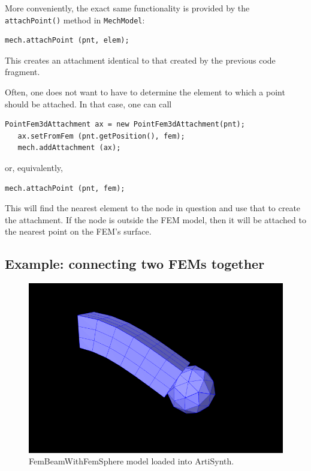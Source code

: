 More conveniently, the exact same functionality is provided
by the {\tt attachPoint()} method in {\tt MechModel}:
%
\begin{lstlisting}[]
   mech.attachPoint (pnt, elem);
\end{lstlisting}
%
This creates an attachment identical to that created by the previous
code fragment.

Often, one does not want to have to determine the element 
to which a point should be attached. In that case, one can call
%
\begin{lstlisting}[]
   PointFem3dAttachment ax = new PointFem3dAttachment(pnt);
   ax.setFromFem (pnt.getPosition(), fem);
   mech.addAttachment (ax);
\end{lstlisting}
%
or, equivalently, 
%
\begin{lstlisting}[]
   mech.attachPoint (pnt, fem);
\end{lstlisting}
%
This will find the nearest element to the node in question and use
that to create the attachment. If the node is outside the FEM model,
then it will be attached to the nearest point on the FEM's surface.

\subsection{Example: connecting two FEMs together}
\label{connectingTwoFems:sec}

\begin{figure}[ht]
	\centering
	\includegraphics[width=\imglength]{images/FemBeamWithFemSphere}
	\caption{FemBeamWithFemSphere model loaded into ArtiSynth.}
	\label{fig:fem:beamwithfemsphere}
\end{figure}

